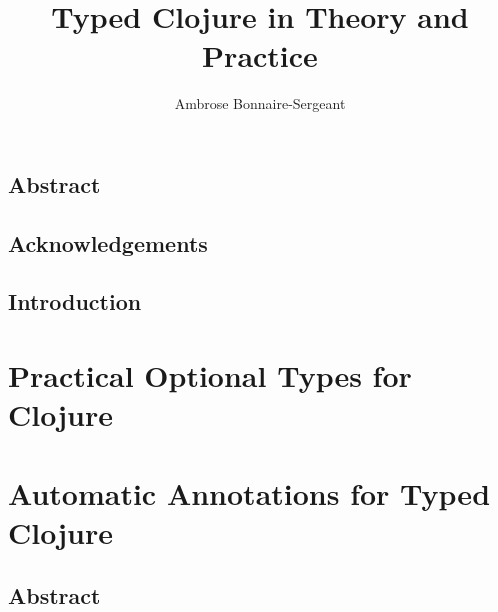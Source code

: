 \documentclass{book}
\title{Typed Clojure in Theory and Practice}
\author{Ambrose Bonnaire-Sergeant}
\begin{document}
\frontmatter %

\maketitle

\chapter*{Abstract}


\chapter*{Acknowledgements}


\tableofcontents

\newpage

\mainmatter

\chapter{Introduction}



\part{Practical Optional Types for Clojure}
\label{part:types}









\part{Automatic Annotations for Typed Clojure}
\label{part:autoann}

\chapter{Abstract}







%

\end{document}
